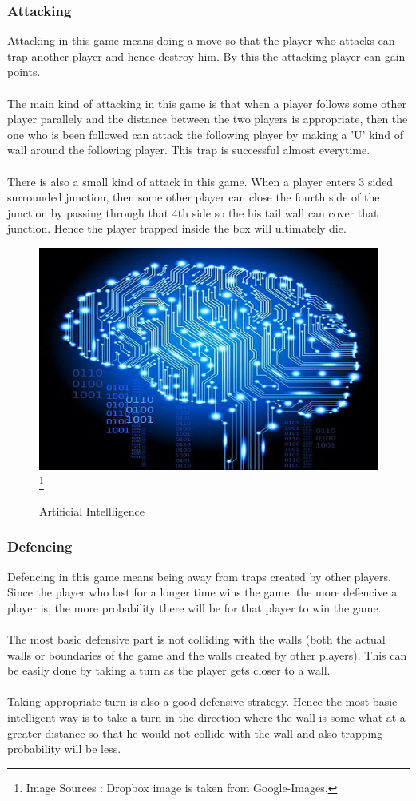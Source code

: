 \documentclass[14 pt]{article}
\begin{document}
\subsubsection{Attacking}
    Attacking in this game means doing a move so that the player who attacks can trap another player and hence destroy him. By this the attacking player can gain points.\\\\
    The main kind of attacking in this game is that when a player follows some other player parallely and the distance between the two players is appropriate, then the one who is been followed can attack the following player by making a 'U' kind of wall around the following player. This trap is successful almost everytime.\\\\
    There is also a small kind of attack in this game. When a player enters 3 sided surrounded junction, then some other player can close the fourth side of the junction by passing through that 4th side so the his tail wall can cover that junction. Hence the player trapped inside the box will ultimately die.\\
    
\begin{figure}[h!]
\centering
\includegraphics[width =100 mm]{3.jpg}
\footnote{Image Sources : Dropbox image is taken from Google-Images.}\\
\caption{Artificial Intellligence}
\end{figure}

\subsubsection{Defencing}
    Defencing in this game means being away from traps created by other players. Since the player who last for a longer time wins the game, the more defencive a player is, the more probability there will be for that player to win the game.\\\\
    The most basic defensive part is not colliding with the walls (both the actual walls or boundaries of the game and the walls created by other players). This can be easily done by taking a turn as the player gets closer to a wall.\\\\
    Taking appropriate turn is also a good defensive strategy. Hence the most basic intelligent way is to take a turn in the direction where the wall is some what at a greater distance so that he would not collide with the wall and also trapping probability will be less.\\
\end{document}
